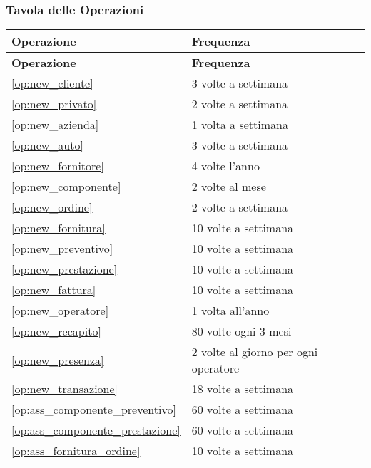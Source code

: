 		\subsubsection{Tavola delle Operazioni}
		
			\begin{longtable}{| p{6.2cm} | p{6.2cm} |}

				\hline
				\textbf{Operazione} & 
				\textbf{Frequenza} \\
				\hline
				
				\endfirsthead
				
				\hline
				\textbf{Operazione} & 
				\textbf{Frequenza} \\
				\hline
				
				\endhead
				
				\ref{op:new_cliente} & 3 volte a settimana \\ \hline
				\ref{op:new_privato} & 2 volte a settimana \\ \hline
				\ref{op:new_azienda} & 1 volta a settimana \\ \hline
				\ref{op:new_auto} & 3 volte a settimana \\ \hline
				\ref{op:new_fornitore} & 4 volte l'anno \\ \hline
				\ref{op:new_componente} & 2 volte al mese \\ \hline
				\ref{op:new_ordine} & 2 volte a settimana \\ \hline
				\ref{op:new_fornitura} & 10 volte a settimana \\ \hline
				\ref{op:new_preventivo} & 10 volte a settimana \\ \hline
				\ref{op:new_prestazione} & 10 volte a settimana \\ \hline
				\ref{op:new_fattura} & 10 volte a settimana \\ \hline
				\ref{op:new_operatore} & 1 volta all'anno \\ \hline
				\ref{op:new_recapito} & 80 volte ogni 3 mesi \\ \hline
				\ref{op:new_presenza} & 2 volte al giorno per ogni operatore \\ \hline
				\ref{op:new_transazione} & 18 volte a settimana \\ \hline

				\ref{op:ass_componente_preventivo} & 60 volte a settimana \\ \hline
				\ref{op:ass_componente_prestazione} & 60 volte a settimana \\ \hline
				\ref{op:ass_fornitura_ordine} & 10 volte a settimana \\ \hline


\end{longtable}

